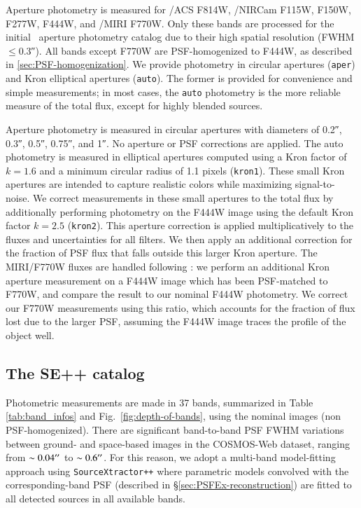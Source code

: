\documentclass[longauth]{aa}
\begin{document}
Aperture photometry is measured for \hst/ACS F814W, \JWST/NIRCam F115W, F150W, F277W, F444W, and \JWST/MIRI F770W.
Only these bands are processed for the initial \hotcold\ aperture photometry catalog due to their high spatial resolution (FWHM$\le$\ang{;;0.3}).
All bands except F770W are PSF-homogenized to F444W, as described in \ref{sec:PSF-homogenization}.
We provide photometry in circular apertures (\texttt{aper}) and Kron elliptical apertures (\texttt{auto}). 
The former is provided for convenience and simple measurements; in most cases, the \texttt{auto} photometry is the more reliable measure of the total flux, except for highly blended sources. 

Aperture photometry is measured in circular apertures with diameters of \ang{;;0.2}, \ang{;;0.3}, \ang{;;0.5}, \ang{;;0.75}, and \ang{;;1}. No aperture or PSF corrections are applied. The auto photometry is measured in elliptical apertures computed using a Kron \citep{Kron1980} factor of $k=1.6$ and a minimum circular radius of 1.1 pixels (\texttt{kron1}). 
These small Kron apertures are intended to capture realistic colors while maximizing signal-to-noise. 
We correct measurements in these small apertures to the total flux by additionally performing photometry on the F444W image using the default Kron factor $k=2.5$ (\texttt{kron2}). 
This aperture correction is applied multiplicatively to the fluxes and uncertainties for all filters.
We then apply an additional correction for the fraction of PSF flux that falls outside this larger Kron aperture. 
The MIRI/F770W fluxes are handled following \citet{Finkelstein2024}: we perform an additional Kron aperture measurement on a F444W image which has been PSF-matched to F770W, and compare the result to our nominal F444W photometry. We correct our F770W measurements using this ratio, which accounts for the fraction of flux lost due to the larger PSF, assuming the F444W image traces the profile of the object well. 


\subsection{The SE++ catalog} \label{sec:TheSE++catalog}

Photometric measurements are made in 37 bands, summarized in Table \ref{tab:band_infos} and Fig.~\ref{fig:depth-of-bands}, using the nominal images (non PSF-homogenized). There are significant band-to-band PSF FWHM variations between ground- and space-based images in the COSMOS-Web dataset, ranging from $\sim 0.04 ^{\prime\prime}$ to $\sim 0.6 ^{\prime\prime}$. For this reason, we adopt a multi-band model-fitting approach using \texttt{SourceXtractor++} where parametric models convolved with the corresponding-band PSF (described in \S\ref{sec:PSFEx-reconstruction}) are fitted to all detected sources in all available bands.
\end{document}
